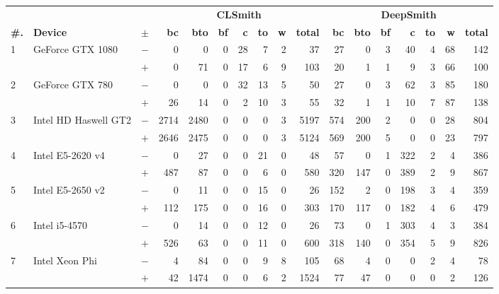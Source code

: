   \begin{tabular}{lll | rrrrrrr | rrrrrrr }
  \toprule
  & & & \multicolumn{7}{c|}{\textbf{CLSmith}} & \multicolumn{7}{c}{\textbf{DeepSmith}} \\
  \textbf{\#.} & \textbf{Device} & $\pm$ &
  \textbf{bc} & \textbf{bto} & \textbf{bf} & \textbf{c} & \textbf{to} & \textbf{w} & \textbf{total} &
  \textbf{bc} & \textbf{bto} & \textbf{bf} & \textbf{c} & \textbf{to} & \textbf{w} & \textbf{total} \\
  \midrule
  \multirow{ 2}{*}{1} & \multirow{ 2}{*}{GeForce GTX 1080} & $-$ & 0 & 0 & 0 & 28 & 7 & 2 & 37       & 27 & 0 & 3 & 40 & 4 & 68 & 142 \\& & $+$ & 0 & 71 & 0 & 17 & 6 & 9 & 103 & 20 & 1 & 1 & 9 & 3 & 66 & 100 \\
\hline
\multirow{ 2}{*}{2} & \multirow{ 2}{*}{GeForce GTX 780} & $-$ & 0 & 0 & 0 & 32 & 13 & 5 & 50       & 27 & 0 & 3 & 62 & 3 & 85 & 180 \\& & $+$ & 26 & 14 & 0 & 2 & 10 & 3 & 55 & 32 & 1 & 1 & 10 & 7 & 87 & 138 \\
\hline
\multirow{ 2}{*}{3} & \multirow{ 2}{*}{Intel HD Haswell GT2} & $-$ & 2714 & 2480 & 0 & 0 & 0 & 3 & 5197       & 574 & 200 & 2 & 0 & 0 & 28 & 804 \\& & $+$ & 2646 & 2475 & 0 & 0 & 0 & 3 & 5124 & 569 & 200 & 5 & 0 & 0 & 23 & 797 \\
\hline
\multirow{ 2}{*}{4} & \multirow{ 2}{*}{Intel E5-2620 v4} & $-$ & 0 & 27 & 0 & 0 & 21 & 0 & 48       & 57 & 0 & 1 & 322 & 2 & 4 & 386 \\& & $+$ & 487 & 87 & 0 & 0 & 6 & 0 & 580 & 320 & 147 & 0 & 389 & 2 & 9 & 867 \\
\hline
\multirow{ 2}{*}{5} & \multirow{ 2}{*}{Intel E5-2650 v2} & $-$ & 0 & 11 & 0 & 0 & 15 & 0 & 26       & 152 & 2 & 0 & 198 & 3 & 4 & 359 \\& & $+$ & 112 & 175 & 0 & 0 & 16 & 0 & 303 & 170 & 117 & 0 & 182 & 4 & 6 & 479 \\
\hline
\multirow{ 2}{*}{6} & \multirow{ 2}{*}{Intel i5-4570} & $-$ & 0 & 14 & 0 & 0 & 12 & 0 & 26       & 73 & 0 & 1 & 303 & 4 & 3 & 384 \\& & $+$ & 526 & 63 & 0 & 0 & 11 & 0 & 600 & 318 & 140 & 0 & 354 & 5 & 9 & 826 \\
\hline
\multirow{ 2}{*}{7} & \multirow{ 2}{*}{Intel Xeon Phi} & $-$ & 4 & 84 & 0 & 0 & 9 & 8 & 105       & 68 & 4 & 0 & 0 & 2 & 4 & 78 \\& & $+$ & 42 & 1474 & 0 & 0 & 6 & 2 & 1524 & 77 & 47 & 0 & 0 & 0 & 2 & 126 \\

\end{tabular}
